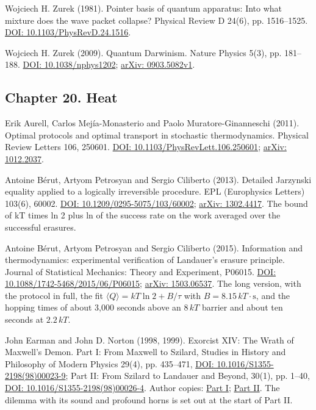 \noindent Wojciech H. Zurek (1981). Pointer basis of quantum apparatus: Into what mixture does the wave packet collapse? Physical Review D 24(6), pp. 1516--1525. \href{https://doi.org/10.1103/PhysRevD.24.1516}{DOI: 10.1103/PhysRevD.24.1516}.
\par\medskip

\noindent Wojciech H. Zurek (2009). Quantum Darwinism. Nature Physics 5(3), pp. 181--188. \href{https://doi.org/10.1038/nphys1202}{DOI: 10.1038/nphys1202}; \href{https://arxiv.org/abs/0903.5082v1}{arXiv: 0903.5082v1}.
\par\medskip

\subsection*{Chapter 20. Heat}

\noindent Erik Aurell, Carlos Mej\'ia-Monasterio and Paolo Muratore-Ginanneschi (2011). Optimal protocols and optimal transport in stochastic thermodynamics. Physical Review Letters 106, 250601. \href{https://doi.org/10.1103/PhysRevLett.106.250601}{DOI: 10.1103/PhysRevLett.106.250601}; \href{https://arxiv.org/abs/1012.2037}{arXiv: 1012.2037}.
\par\medskip

\noindent Antoine B\'erut, Artyom Petrosyan and Sergio Ciliberto (2013). Detailed Jarzynski equality applied to a logically irreversible procedure. EPL (Europhysics Letters) 103(6), 60002. \href{https://doi.org/10.1209/0295-5075/103/60002}{DOI: 10.1209/0295-5075/103/60002}; \href{https://arxiv.org/abs/1302.4417}{arXiv: 1302.4417}. The bound of kT times ln 2 plus ln of the success rate on the work averaged over the successful erasures.
\par\medskip

\noindent Antoine B\'erut, Artyom Petrosyan and Sergio Ciliberto (2015). Information and thermodynamics: experimental verification of Landauer's erasure principle. Journal of Statistical Mechanics: Theory and Experiment, P06015. \href{https://doi.org/10.1088/1742-5468/2015/06/P06015}{DOI: 10.1088/1742-5468/2015/06/P06015}; \href{https://arxiv.org/abs/1503.06537}{arXiv: 1503.06537}. The long version, with the protocol in full, the fit $\langle Q\rangle = kT\ln 2 + B/\tau$ with $B = 8.15\,kT\cdot\mathrm{s}$, and the hopping times of about 3,000 seconds above an $8\,kT$ barrier and about ten seconds at $2.2\,kT$.
\par\medskip

\noindent John Earman and John D. Norton (1998, 1999). Exorcist XIV: The Wrath of Maxwell's Demon. Part I: From Maxwell to Szilard, Studies in History and Philosophy of Modern Physics 29(4), pp. 435--471, \href{https://doi.org/10.1016/S1355-2198(98)00023-9}{DOI: 10.1016/S1355-2198(98)00023-9}; Part II: From Szilard to Landauer and Beyond, 30(1), pp. 1--40, \href{https://doi.org/10.1016/S1355-2198(98)00026-4}{DOI: 10.1016/S1355-2198(98)00026-4}. Author copies: \href{https://sites.pitt.edu/~jdnorton/papers/ExorcistXIV/Exorcist1.pdf}{Part I}; \href{https://sites.pitt.edu/~jdnorton/papers/ExorcistXIV/Exorcist2.pdf}{Part II}. The dilemma with its sound and profound horns is set out at the start of Part II.
\par\medskip

